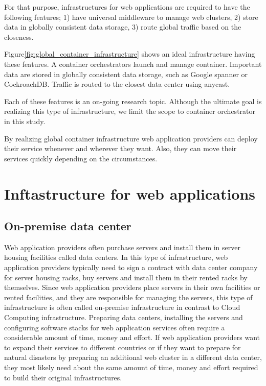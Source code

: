 For that purpose, infrastructures for web applications are required to have the following features;
1) have universal middleware to manage web clusters,
2) store data in globally consistent data storage,
3) route global traffic based on the closeness.

Figure\ref{fig:global_container_infrastructure} shows an ideal infrastructure having these features.
A container orchestrators launch and manage container.
Important data are stored in globally consistent data storage, such as Google spanner\cite{Corbett:2013:SGG:2518037.2491245,Cooper:2013:SGG:2485732.2485756} or CockroachDB\cite{pavlo2016s}.
Traffic is routed to the closest data center using anycast\cite{Weiden:2010:ALB:1924976.1925002}.

Each of these features is an on-going research topic.
Although the ultimate goal is realizing this type of infrastructure, we limit the scope to container orchestrator in this study.

By realizing global container infrastructure web application providers can deploy their service whenever and wherever they want.
Also, they can move their services quickly depending on the circumstances.

\section{Inftastructure for web applications}

\subsection{On-premise data center}

Web application providers often purchase servers and install them in server housing facilities called data centers.
In this type of infrastructure, web application providers typically need to sign a contract with data center company for server housing racks, buy servers and install them in their rented racks by themselves.
Since web application providers place servers in their own facilities or rented facilities, and they are responsible for managing the servers, this type of infrastructure is often called on-premise infrastructure in contrast to Cloud Computing infrastructure.
Preparing data centers, installing the servers and configuring software stacks for web application services often require a considerable amount of time, money and effort.
If web application providers want to expand their services to different countries or if they want to prepare for natural disasters by preparing an additional web cluster in a different data center, they most likely need about the same amount of time, money and effort required to build their original infrastructures.

